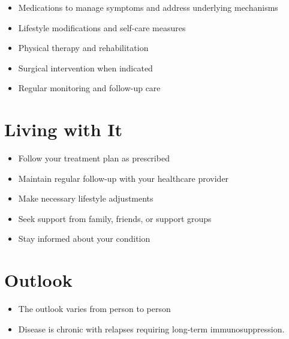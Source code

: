 \begin{itemize}[noitemsep]
  \item Medications to manage symptoms and address underlying mechanisms
  \item Lifestyle modifications and self-care measures
  \item Physical therapy and rehabilitation
  \item Surgical intervention when indicated
  \item Regular monitoring and follow-up care
\end{itemize}
\section{Living with It}
\begin{itemize}[noitemsep]
  \item Follow your treatment plan as prescribed
  \item Maintain regular follow-up with your healthcare provider
  \item Make necessary lifestyle adjustments
  \item Seek support from family, friends, or support groups
  \item Stay informed about your condition
\end{itemize}
\section{Outlook}
\begin{itemize}[noitemsep]
  \item The outlook varies from person to person
  \item Disease is chronic with relapses requiring long-term immunosuppression.
\end{itemize}
